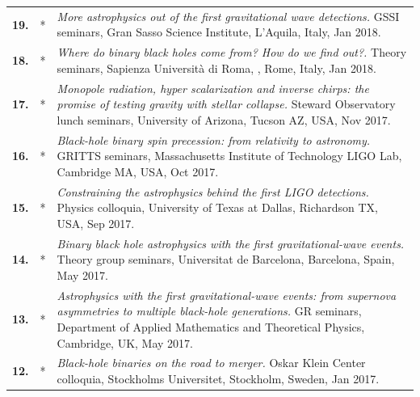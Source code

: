 {\begin{longtable}{rp{0.3cm}p{15.8cm}}
%
\textbf{19.} & * & \textit{More astrophysics out of the first gravitational wave detections.}
\newline{}
GSSI seminars, Gran Sasso Science Institute, L'Aquila, Italy, Jan 2018.
\vspace{0.05cm}\\
%
\textbf{18.} & * & \textit{Where do binary black holes come from? How do we find out?.}
\newline{}
Theory seminars, Sapienza Università di Roma, , Rome, Italy, Jan 2018.
\vspace{0.05cm}\\
%
\textbf{17.} & * & \textit{Monopole radiation, hyper scalarization and inverse chirps: the promise of testing gravity with stellar collapse.}
\newline{}
Steward Observatory lunch seminars, University of Arizona, Tucson AZ, USA, Nov 2017.
\vspace{0.05cm}\\
%
\textbf{16.} & * & \textit{Black-hole binary spin precession: from relativity to astronomy.}
\newline{}
GRITTS seminars, Massachusetts Institute of Technology LIGO Lab, Cambridge MA, USA, Oct 2017.
\vspace{0.05cm}\\
%
\textbf{15.} & * & \textit{Constraining the astrophysics behind the first LIGO detections.}
\newline{}
Physics colloquia, University of Texas at Dallas, Richardson TX, USA, Sep 2017.
\vspace{0.05cm}\\
%
\textbf{14.} & * & \textit{Binary black hole astrophysics with the first gravitational-wave events.}
\newline{}
Theory group seminars, Universitat de Barcelona, Barcelona, Spain, May 2017.
\vspace{0.05cm}\\
%
\textbf{13.} & * & \textit{Astrophysics with the first gravitational-wave events: from supernova asymmetries to multiple black-hole generations.}
\newline{}
GR seminars, Department of Applied Mathematics and Theoretical Physics, Cambridge, UK, May 2017.
\vspace{0.05cm}\\
%
\textbf{12.} & * & \textit{Black-hole binaries on the road to merger.}
\newline{}
Oskar Klein Center colloquia, Stockholms Universitet, Stockholm, Sweden, Jan 2017.
\vspace{0.05cm}\\

\end{longtable}}
